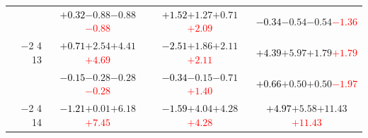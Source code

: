 \documentclass[compress]{beamer}
\begin{document}
\begin{frame}
\begin{tabular}{r | c | c | c}
          & \textcolor{black}{$+0.32$}\hspace{0.1 cm}$-0.88$\hspace{0.1 cm}$-0.88$\hspace{0.1 cm}\textcolor{red}{$-0.88$} & \textcolor{black}{$+1.52$}\hspace{0.1 cm}$+1.27$\hspace{0.1 cm}$+0.71$\hspace{0.1 cm}\textcolor{red}{$+2.09$} & \textcolor{black}{$-0.34$}\hspace{0.1 cm}$-0.54$\hspace{0.1 cm}$-0.54$\hspace{0.1 cm}\textcolor{red}{$-1.36$} \\
$-$2 4 13 & \textcolor{black}{$+0.71$}\hspace{0.1 cm}$+2.54$\hspace{0.1 cm}$+4.41$\hspace{0.1 cm}\textcolor{red}{$+4.69$} & \textcolor{black}{$-2.51$}\hspace{0.1 cm}$+1.86$\hspace{0.1 cm}$+2.11$\hspace{0.1 cm}\textcolor{red}{$+2.11$} & \textcolor{black}{$+4.39$}\hspace{0.1 cm}$+5.97$\hspace{0.1 cm}$+1.79$\hspace{0.1 cm}\textcolor{red}{$+1.79$} \\
          & \textcolor{black}{$-0.15$}\hspace{0.1 cm}$-0.28$\hspace{0.1 cm}$-0.28$\hspace{0.1 cm}\textcolor{red}{$-0.28$} & \textcolor{black}{$-0.34$}\hspace{0.1 cm}$-0.15$\hspace{0.1 cm}$-0.71$\hspace{0.1 cm}\textcolor{red}{$+1.40$} & \textcolor{black}{$+0.66$}\hspace{0.1 cm}$+0.50$\hspace{0.1 cm}$+0.50$\hspace{0.1 cm}\textcolor{red}{$-1.97$} \\
$-$2 4 14 & \textcolor{black}{$-1.21$}\hspace{0.1 cm}$+0.01$\hspace{0.1 cm}$+6.18$\hspace{0.1 cm}\textcolor{red}{$+7.45$} & \textcolor{black}{$-1.59$}\hspace{0.1 cm}$+4.04$\hspace{0.1 cm}$+4.28$\hspace{0.1 cm}\textcolor{red}{$+4.28$} & \textcolor{black}{$+4.97$}\hspace{0.1 cm}$+5.58$\hspace{0.1 cm}$+11.43$\hspace{0.1 cm}\textcolor{red}{$+11.43$} \\

\end{tabular}
\end{frame}
\end{document}
